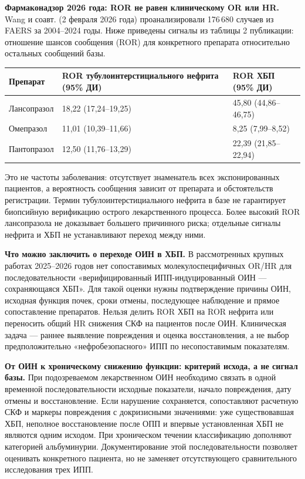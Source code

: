 \documentclass[11pt,a4paper,notitlepage]{report}
\newcommand{\src}[1]{\unskip\space\cite{#1}}
\begin{document}
\textbf{Фармаконадзор 2026 года: ROR не равен клиническому OR или HR.} Wang и соавт. (2 февраля 2026 года) проанализировали 176\,680 случаев из FAERS за 2004--2024 годы. Ниже приведены сигналы из таблицы 2 публикации: отношение шансов сообщения (ROR) для конкретного препарата относительно остальных сообщений базы.\src{renalfaers2026}
\begin{longtable}{P{0.22\textwidth}P{0.34\textwidth}P{0.35\textwidth}}
\toprule
Препарат & ROR тубулоинтерстициального нефрита (95\% ДИ) & ROR ХБП (95\% ДИ) \\
\midrule
\endhead
Лансопразол & 18,22 (17,24--19,25) & 45,80 (44,86--46,75) \\
Омепразол & 11,01 (10,39--11,66) & 8,25 (7,99--8,52) \\
Пантопразол & 12,50 (11,76--13,29) & 22,39 (21,85--22,94) \\
\bottomrule
\end{longtable}
Это не частоты заболевания: отсутствует знаменатель всех экспонированных пациентов, а вероятность сообщения зависит от препарата и обстоятельств регистрации. Термин тубулоинтерстициального нефрита в базе не гарантирует биопсийную верификацию острого лекарственного процесса. Более высокий ROR лансопразола не доказывает большего причинного риска; отдельные сигналы нефрита и ХБП не устанавливают переход между ними.\src{renalfaers2026}

\textbf{Что можно заключить о переходе ОИН в ХБП.} В рассмотренных крупных работах 2025--2026 годов нет сопоставимых молекулоспецифичных OR/HR для последовательности «верифицированный ИПП-индуцированный ОИН --- сохраняющаяся ХБП». Для такой оценки нужны подтверждение причины ОИН, исходная функция почек, сроки отмены, последующее наблюдение и прямое сопоставление препаратов. Нельзя делить ROR ХБП на ROR нефрита или переносить общий HR снижения СКФ на пациентов после ОИН. Клиническая задача --- раннее выявление повреждения и оценка восстановления, а не выбор предположительно «нефробезопасного» ИПП по несопоставимым показателям.\src{renalbigan2025,renaltrinetx2025,renalfaers2026,renalniceaki}

\textbf{От ОИН к хроническому снижению функции: критерий исхода, а не сигнал базы.} При подозреваемом лекарственном ОИН необходимо связать в одной временной последовательности исходные показатели, начало повреждения, дату отмены и восстановление. Если нарушение сохраняется, сопоставляют расчетную СКФ и маркеры повреждения с докризисными значениями: уже существовавшая ХБП, неполное восстановление после ОПП и впервые установленная ХБП не являются одним исходом. При хроническом течении классификацию дополняют категорией альбуминурии. Документирование этой последовательности позволяет оценивать конкретного пациента, но не заменяет отсутствующего сравнительного исследования трех ИПП.\src{renalniceaki,renalniceckd}
\end{document}
